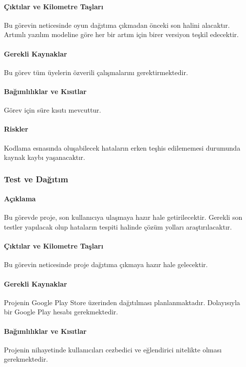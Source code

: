\documentclass[12pt,a4paper]{article}
\begin{document}
   \paragraph{Çıktılar ve Kilometre Taşları}
   Bu görevin neticesinde oyun dağıtıma çıkmadan önceki son halini alacaktır. Artımlı yazılım modeline göre her bir artım için birer versiyon teşkil edecektir.
   \paragraph{Gerekli Kaynaklar}
   Bu görev tüm üyelerin özverili çalışmalarını gerektirmektedir. 
   \paragraph{Bağımlılıklar ve Kısıtlar}
   Görev için süre kısıtı mevcuttur.
   \paragraph{Riskler}
   Kodlama esnasında oluşabilecek hataların erken teşhis edilememesi durumunda kaynak kaybı yaşanacaktır.

   \subsubsection{Test ve Dağıtım}
   \paragraph{Açıklama}
   Bu görevde proje, son kullanıcıya ulaşmaya hazır hale getirilecektir. Gerekli son testler yapılacak olup hataların tespiti halinde çözüm yolları araştırılacaktır.
   \paragraph{Çıktılar ve Kilometre Taşları}
   Bu görevin neticesinde proje dağıtıma çıkmaya hazır hale gelecektir.
   \paragraph{Gerekli Kaynaklar}
   Projenin Google Play Store üzerinden dağıtılması planlanmaktadır. Dolayısıyla bir Google Play hesabı gerekmektedir.
   \paragraph{Bağımlılıklar ve Kısıtlar}
   Projenin nihayetinde kullanıcıları cezbedici ve eğlendirici nitelikte olması gerekmektedir.
\end{document}
